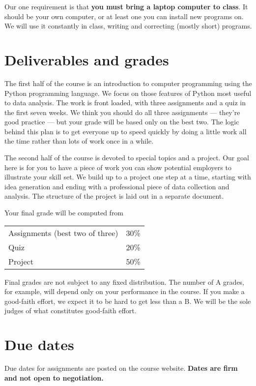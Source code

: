 \documentclass[11pt]{article}
\begin{document}
Our one requirement is that {\bf you must bring a laptop computer to class\/}.
It should be your own computer, or at least one you can install new programs on.
We will use it constantly in class, writing and correcting (mostly short) programs.


\section*{Deliverables and grades}

The first half of the course is an introduction to computer programming
using the Python programming language.
We focus on those features of Python most useful to data analysis.
The work is front loaded, with three assignments and a quiz
in the first seven weeks.
We think you should do all three assignments --- they're good practice ---
but your grade will be based only on the best two.
The logic behind this plan is to get everyone up to speed quickly
by doing a little work all the time rather than lots of work once in a while.


The second half of the course is devoted to special topics and a project.
Our goal here is for you to have a piece of work you can show potential employers
to illustrate your skill set.
We build up to a project one step at a time, starting with idea generation and ending
with a professional piece of data collection and analysis.
The structure of the project is laid out in a separate document.

Your final grade will be computed from
\begin{center}
\begin{tabular}{ll}
Assignments (best two of three) & 30\% \\
Quiz        & 20\% \\
Project     & 50\% \\
\end{tabular}
\end{center}
Final grades are not subject to any fixed distribution.
The number of A grades, for example,
will depend only on your performance in the course.
If you make a good-faith effort,
we expect it to be hard to get less than a B.
We will be the sole judges of what constitutes good-faith effort.  


\section*{Due dates}

Due dates for assignments are posted on the course website.  
{\bf Dates are firm and not open to negotiation.}
\end{document}
